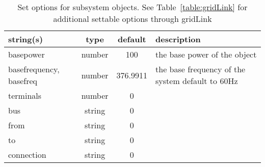 \begin{table}[ht]
\centering
\begin{tabular}{p{5cm} c c p{7cm}}
\hline
string(s) & type & default & description \\
\hline
basepower & number & 100 & the base power of the object\\
basefrequency, basefreq & number & 376.9911 & the base frequency of the system default to 60Hz\\
terminals & number & 0 & \\
bus & string & 0 & \\
from & string & 0 & \\
to & string & 0 & \\
connection & string & 0 & \\
\hline
\end{tabular}
\caption{Set options for subsystem objects. See Table~\ref{table:gridLink} for additional settable options through gridLink}
\label{table:subsystem}
\end{table}
